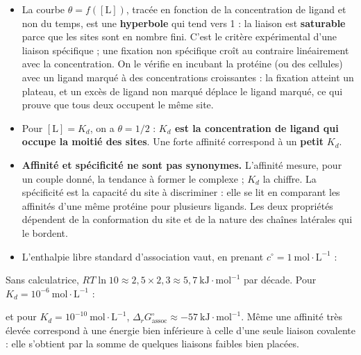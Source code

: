 \documentclass[11pt,a4paper]{article}
\providecommand{\tightlist}{\setlength{\itemsep}{0pt}\setlength{\parskip}{0pt}}
\newcommand{\equationajustee}[1]{%
  \sbox{\boiteequation}{$\displaystyle #1$}%
  \ifdim\wd\boiteequation>\linewidth
    \[\resizebox{\linewidth}{!}{\usebox{\boiteequation}}\]%
  \else
    \[#1\]%
  \fi}
\begin{document}
\begin{itemize}
\tightlist
\item
  La courbe \(\theta = f([\mathrm{L}])\), tracée en fonction de la concentration de ligand et non du temps, est une \textbf{hyperbole} qui tend vers 1 : la liaison est \textbf{saturable} parce que les sites sont en nombre fini. C'est le critère expérimental d'une liaison spécifique ; une fixation non spécifique croît au contraire linéairement avec la concentration. On le vérifie en incubant la protéine (ou des cellules) avec un ligand marqué à des concentrations croissantes : la fixation atteint un plateau, et un excès de ligand non marqué déplace le ligand marqué, ce qui prouve que tous deux occupent le même site.
\item
  Pour \([\mathrm{L}] = K_d\), on a \(\theta = 1/2\) : \textbf{\(K_d\) est la concentration de ligand qui occupe la moitié des sites}. Une forte affinité correspond à un \textbf{petit} \(K_d\).
\item
  \textbf{Affinité et spécificité ne sont pas synonymes.} L'affinité mesure, pour un couple donné, la tendance à former le complexe ; \(K_d\) la chiffre. La spécificité est la capacité du site à discriminer : elle se lit en comparant les affinités d'une même protéine pour plusieurs ligands. Les deux propriétés dépendent de la conformation du site et de la nature des chaînes latérales qui le bordent.
\item
  L'enthalpie libre standard d'association vaut, en prenant \(c^\circ = 1\ \mathrm{mol\cdot L^{-1}}\) :
\end{itemize}

\equationajustee{\begin{aligned}
\Delta_r G^\circ_{\text{assoc}} &= -RT \ln K_a \\
&= RT \ln \frac{K_d}{c^\circ}
\end{aligned}}

Sans calculatrice, \(RT\ln 10 \approx 2{,}5 \times 2{,}3 \approx 5{,}7\ \mathrm{kJ\cdot mol^{-1}}\) par décade. Pour \(K_d = 10^{-6}\ \mathrm{mol\cdot L^{-1}}\) :

\equationajustee{\boxed{\Delta_r G^\circ_{\text{assoc}} \approx -6 \times 5{,}7 \approx -34\ \mathrm{kJ\cdot mol^{-1}}}}

et pour \(K_d = 10^{-10}\ \mathrm{mol\cdot L^{-1}}\), \(\Delta_r G^\circ_{\text{assoc}} \approx -57\ \mathrm{kJ\cdot mol^{-1}}\). Même une affinité très élevée correspond à une énergie bien inférieure à celle d'une seule liaison covalente : elle s'obtient par la somme de quelques liaisons faibles bien placées.
\end{document}
